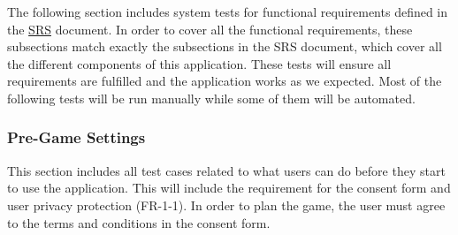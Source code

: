 \documentclass[12pt, titlepage]{article}
\begin{document}
The following section includes system tests for functional requirements defined in the \href{https://github.com/beatlepie/4G06CapstoneProjectTeam2/blob/main/docs/SRS-Volere/SRS.pdf}{SRS} document. In order to cover all the functional requirements, these subsections match exactly the subsections in the SRS document, which cover all the different components of this application. These tests will ensure all requirements are fulfilled and the application works as we expected. Most of the following tests will be run manually while some of them will be automated.

\subsubsection{Pre-Game Settings}

This section includes all test cases related to what users can do before they start to use the application. This will include the requirement for the consent form and user privacy protection (FR-1-1). In order to plan the game, the user must agree to the terms and conditions in the consent form.
\end{document}
